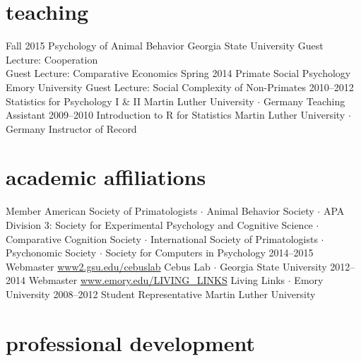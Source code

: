 \documentclass[]{friggeri-cv}
\begin{document}
\newpage
\thispagestyle{fancy}

\section{teaching}

\begin{entrylist}
  \entry
    {Fall 2015}
    {Psychology of Animal Behavior}
    {Georgia State University}
    {Guest Lecture: Cooperation\\
    Guest Lecture: Comparative Economics}
  \entry
    {Spring 2014}
    {Primate Social Psychology}
    {Emory University}
    {Guest Lecture: Social Complexity of Non-Primates}
  \entry
    {2010--2012}
    {Statistics for Psychology I \& II}
    {Martin Luther University $\cdot$ Germany}
    {Teaching Assistant}
  \entry
    {2009--2010}
    {Introduction to R for Statistics}
    {Martin Luther University $\cdot$ Germany}
    {Instructor of Record}
\end{entrylist}


\section{academic affiliations}

\begin{entrylist}
  \entry
    {}
    {Member}
    {}
    {
    American Society of Primatologists $\cdot$
    Animal Behavior Society $\cdot$
    APA Division 3: Society for Experimental Psychology and Cognitive Science $\cdot$
    Comparative Cognition Society $\cdot$
    International Society of Primatologists $\cdot$
    Psychonomic Society $\cdot$
    Society for Computers in Psychology
    }
  \entry
    {2014--2015}
    {Webmaster}
    {\href{http://www2.gsu.edu/cebuslab}{www2.gsu.edu/cebuslab}}
    {Cebus Lab $\cdot$ Georgia State University}
  \entry
    {2012--2014}
    {Webmaster}
    {\href{http://www.emory.edu/LIVING_LINKS}{www.emory.edu/LIVING\_LINKS}}
    {Living Links $\cdot$ Emory University}
  \entry
    {2008--2012}
    {Student Representative}
    {}
    {Martin Luther University}
\end{entrylist}

\section{professional development}
\end{document}
